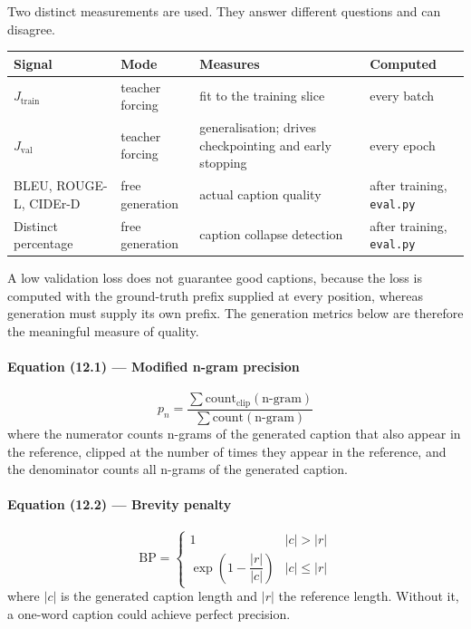\documentclass[12pt]{article}
\newcommand{\code}[1]{\texttt{#1}}
\begin{document}
Two distinct measurements are used. They answer different questions and can disagree.

\begin{center}
\begin{tabular}{@{}lL{2.2cm}L{4.2cm}L{2.7cm}@{}}
\toprule
Signal & Mode & Measures & Computed \\
\midrule
$J_{\mathrm{train}}$ & teacher forcing & fit to the training slice & every batch \\
$J_{\mathrm{val}}$ & teacher forcing & generalisation; drives checkpointing and early stopping & every epoch \\
BLEU, ROUGE-L, CIDEr-D & free generation & actual caption quality & after training, \code{eval.py} \\
Distinct percentage & free generation & caption collapse detection & after training, \code{eval.py} \\
\bottomrule
\end{tabular}
\end{center}

A low validation loss does not guarantee good captions, because the loss is computed with the ground-truth prefix supplied at every position, whereas generation must supply its own prefix. The generation metrics below are therefore the meaningful measure of quality.

\paragraph{Equation (12.1) --- Modified n-gram precision}
\begin{equation}
p_n = \frac{\sum \mathrm{count}_{\mathrm{clip}}(\text{n-gram})}{\sum \mathrm{count}(\text{n-gram})}
\end{equation}
where the numerator counts n-grams of the generated caption that also appear in the reference, clipped at the number of times they appear in the reference, and the denominator counts all n-grams of the generated caption.

\paragraph{Equation (12.2) --- Brevity penalty}
\begin{equation}
\mathrm{BP} =
\begin{cases}
1 & |c| > |r| \\
\exp\!\left(1 - \dfrac{|r|}{|c|}\right) & |c| \le |r|
\end{cases}
\end{equation}
where $|c|$ is the generated caption length and $|r|$ the reference length. Without it, a one-word caption could achieve perfect precision.
\end{document}
